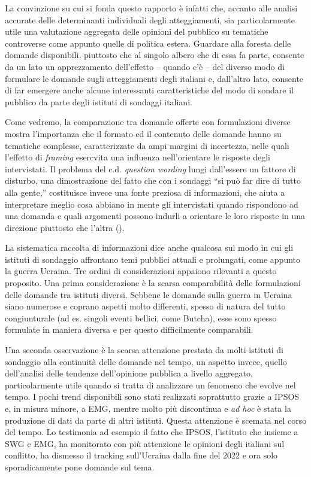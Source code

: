 \documentclass[
  openany]{book}
\begin{document}
La convinzione su cui si fonda questo rapporto è infatti che, accanto alle analisi accurate delle determinanti individuali degli atteggiamenti, sia particolarmente utile una valutazione aggregata delle opinioni del pubblico su tematiche controverse come appunto quelle di politica estera. Guardare alla foresta delle domande disponibili, piuttosto che al singolo albero che di essa fa parte, consente da un lato un apprezzamento dell'effetto -- quando c'è -- del diverso modo di formulare le domande sugli atteggiamenti degli italiani e, dall'altro lato, consente di far emergere anche alcune interessanti caratteristiche del modo di sondare il pubblico da parte degli istituti di sondaggi italiani.

Come vedremo, la comparazione tra domande offerte con formulazioni diverse mostra l'importanza che il formato ed il contenuto delle domande hanno su tematiche complesse, caratterizzate da ampi margini di incertezza, nelle quali l'effetto di \emph{framing} esercvita una influenza nell'orientare le risposte degli intervistati. Il problema del c.d. \emph{question wording} lungi dall'essere un fattore di disturbo, una dimostrazione del fatto che con i sondaggi ``si può far dire di tutto alla gente,'' costituisce invece una fonte preziosa di informazioni, che aiuta a interpretare meglio cosa abbiano in mente gli intervistati quando rispondono ad una domanda e quali argomenti possono indurli a orientare le loro risposte in una direzione piuttosto che l'altra (\citet{Sudman-Bradburn1974}).

La sistematica raccolta di informazioni dice anche qualcosa sul modo in cui gli istituti di sondaggio affrontano temi pubblici attuali e prolungati, come appunto la guerra Ucraina. Tre ordini di considerazioni appaiono rilevanti a questo proposito. Una prima considerazione è la scarsa comparabilità delle formulazioni delle domande tra istituti diversi. Sebbene le domande sulla guerra in Ucraina siano numerose e coprano aspetti molto differenti, spesso di natura del tutto congiunturale (ad es. singoli eventi bellici, come Butcha), esse sono spesso formulate in maniera diversa e per questo difficilmente comparabili.

Una seconda osservazione è la scarsa attenzione prestata da molti istituti di sondaggio alla continuità delle domande nel tempo, un aspetto invece, quello dell'analisi delle tendenze dell'opinione pubblica a livello aggregato, particolarmente utile quando si tratta di analizzare un fenomeno che evolve nel tempo. I pochi trend disponibili sono stati realizzati soprattutto grazie a IPSOS e, in misura minore, a EMG, mentre molto più discontinua e \emph{ad hoc} è stata la produzione di dati da parte di altri istituti. Questa attenzione è scemata nel corso del tempo. Lo testimonia ad esempio il fatto che IPSOS, l'istituto che insieme a SWG e EMG, ha monitorato con più attenzione le opinioni degli italiani sul conflitto, ha dismesso il tracking sull'Ucraina dalla fine del 2022 e ora solo sporadicamente pone domande sul tema.
\end{document}
